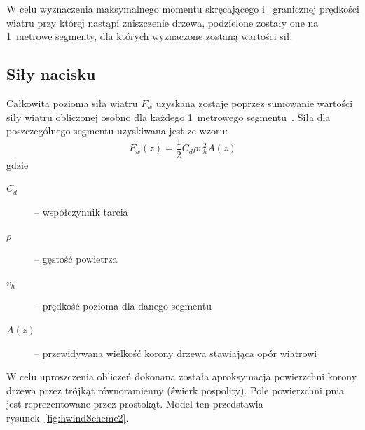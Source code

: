W celu wyznaczenia maksymalnego momentu skręcającego i ~granicznej prędkości wiatru przy której nastąpi zniszczenie drzewa, podzielone zostały one na 1~metrowe segmenty, dla których wyznaczone zostaną wartości sił.


\subsection{Siły nacisku}

Całkowita pozioma siła wiatru $F_w$ uzyskana zostaje poprzez sumowanie wartości siły wiatru obliczonej osobno dla każdego 1~metrowego segmentu~\cite{hpsk_hwind}. Siła dla poszczególnego segmentu uzyskiwana jest ze wzoru:
\begin{equation}
\label{eq:windForce}
 	F_w(z) = \frac{1}{2}C_d  \rho v_h^2 A(z)
\end{equation}
gdzie
\begin{description}
	\item[$C_d$] -- współczynnik tarcia
	\item[$\rho$ ]-- gęstość powietrza
	\item[$v_h$ ]-- prędkość pozioma dla danego segmentu
	\item[$A(z)$]-- przewidywana wielkość korony drzewa stawiająca opór wiatrowi
\end{description}

W celu uproszczenia obliczeń dokonana została aproksymacja powierzchni korony drzewa przez trójkąt równoramienny (świerk pospolity). Pole powierzchni pnia jest reprezentowane przez prostokąt. Model ten przedstawia rysunek~\ref{fig:hwindScheme2}.

